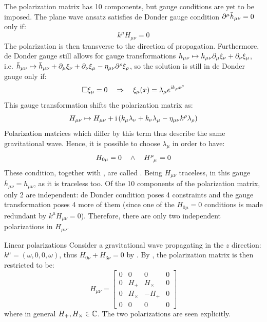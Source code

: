 The polarization matrix has 10 components, but gauge conditions are yet to be imposed. The plane wave ansatz satisfies de Donder gauge condition $ \partial^\mu \bar{h}_{\mu \nu} = 0 $ only if:
\begin{equation}
  k^\mu  H_{\mu \nu} = 0
  \label{eq:transverse}
\end{equation}
The polarization is then transverse to the direction of propagation. Furthermore, de Donder gauge still allows for gauge transformations $ h_{\mu \nu} \mapsto h_{\mu \nu} \partial_\mu \xi_\nu + \partial_\nu \xi_\mu $, i.e. $ \bar{h}_{\mu \nu} \mapsto \bar{h}_{\mu \nu} + \partial_\mu \xi_\nu + \partial_\nu \xi_\mu - \eta_{\mu \nu} \partial^\rho \xi_\rho $, so the solution is still in de Donder gauge only if:
\begin{equation*}
  \Box \xi_\mu = 0 \quad \Rightarrow \quad \xi_\mu(x) = \lambda_\mu e^{\mathrm{i} k_\rho x^\rho}
\end{equation*}
This gauge transformation shifts the polarization matrix as:
\begin{equation}
  H_{\mu \nu} \mapsto H_{\mu \nu} + \mathrm{i} \left( k_\mu \lambda_\nu + k_\nu \lambda_\mu - \eta_{\mu \nu} k^\rho \lambda_\rho \right)
  \label{eq:gw-gauge-tr}
\end{equation}
Polarization matrices which differ by this term thus describe the same gravitational wave. Hence, it is possible to choose $ \lambda_\mu $ in order to have:
\begin{equation}
  H_{0 \mu} = 0 \quad \land \quad \tensor{H}{^\mu_\mu} = 0
  \label{eq:traceless}
\end{equation}
These condition, together with , are called . Being $ H_{\mu \nu} $ traceless, in this gauge $ \bar{h}_{\mu \nu} = h_{\mu \nu} $, as it is traceless too. Of the 10 components of the polarization matrix, only 2 are independent: de Donder condition  poses 4 constraints and the gauge transformation  poses 4 more of them (since one of the $ H_{0\mu} = 0 $ conditions is made redundant by $ k^\mu H_{\mu \nu} = 0 $). Therefore, there are only two independent polarizations in $ H_{\mu \nu} $.

\begin{example}{Linear polarizations}{}
  Consider a gravitational wave propagating in the $ z $ direction: $ k^\mu = (\omega,0,0,\omega) $, thus $ H_{0 \nu} + H_{3 \nu} = 0 $ by . By , the polarization matrix is then restricted to be:
  \begin{equation}
    H_{\mu \nu} =
    \begin{bmatrix}
      0 & 0 & 0 & 0 \\
      0 & H_+ & H_\times & 0 \\
      0 & H_\times & -H_+ & 0 \\
      0 & 0 & 0 & 0
    \end{bmatrix}
    \label{eq:gw-polarizations}
  \end{equation}
  where in general $ H_+, H_\times \in \mathbb{C} $. The two polarizations are seen explicitly.
\end{example}

